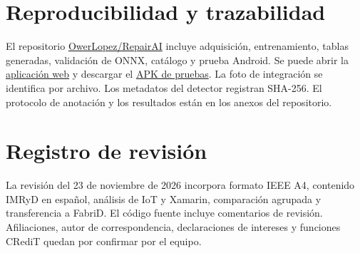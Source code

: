 \documentclass[conference,a4paper]{IEEEtran}
\begin{document}
\appendices
\section{Reproducibilidad y trazabilidad}
El repositorio \href{https://github.com/OwerLopez/RepairAI}{OwerLopez/RepairAI} incluye adquisición, entrenamiento, tablas generadas, validación de ONNX, catálogo y prueba Android. Se puede abrir la \href{https://owerlopez.github.io/RepairAI/}{aplicación web} y descargar el \href{https://github.com/OwerLopez/RepairAI/releases/tag/v0.2.0}{APK de pruebas}. La foto de integración se identifica por archivo. Los metadatos del detector registran SHA-256. El protocolo de anotación y los resultados están en los anexos del repositorio.

\section{Registro de revisión}
La revisión del 23 de noviembre de 2026 incorpora formato IEEE A4, contenido IMRyD en español, análisis de IoT y Xamarin, comparación agrupada y transferencia a FabriD. El código fuente incluye comentarios de revisión. Afiliaciones, autor de correspondencia, declaraciones de intereses y funciones CRediT quedan por confirmar por el equipo.



\end{document}
